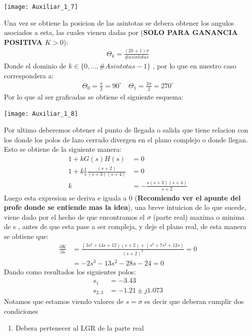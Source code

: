 \documentclass[
  11pt,
  letterpaper,
   addpoints,
   answers
  ]{exam}
\begin{document}
\begin{questions}
\begin{solution}
\begin{center}
    \texttt{[image: Auxiliar\_1\_7]}
  \end{center}
Una vez se obtiene la posicion de las asintotas se debera obtener los angulos asociados a esta, las cuales vienen dadas por (\textbf{SOLO PARA GANANCIA POSITIVA $K>0$}):
\begin{align}
    \Theta_{k} = \frac{(2k+1)\pi}{\#asintotas}
\end{align}
Donde el dominio de $k \in \{0,...,\#Asintotas -1 \}$ , por lo que en nuestro caso correspondera a:
\begin{align}
    \Theta_{0} = \frac{\pi}{2} = 90^{\circ} \quad \Theta_{1} = \frac{3\pi}{2}= 270^{\circ}
\end{align}
Por lo que al ser graficadas se obtiene el siguiente esquema:
\begin{center}
    \texttt{[image: Auxiliar\_1\_8]}
  \end{center}
Por ultimo deberemos obtener el punto de llegada o salida que tiene relacion con los donde los polos de lazo cerrado divergen en el plano complejo o donde llegan. Esto se obtiene de la siguiente manera:
\begin{align}
    1+kG(s)H(s) &= 0\\
    1+k\frac{1}{s} \frac{(s+2)}{(s+3)(s+4)} &= 0\\
    k & = -\frac{s(s+3)(s+4)}{s+2}
\end{align}
Luego esta expresion se deriva e iguala a 0 (\textbf{Recomiendo ver el apunte del profe donde se entiende mas la idea}), una breve intuicion de lo que sucede, viene dado por el hecho de que encontramos el $\sigma$ (parte real) maxima o minima de s , antes de que esta pase a ser compleja, y deje el plano real, de esta manera se obtiene que:
\begin{align}
    \frac{\partial K}{\partial s} &= \frac{(3s^{2} +14s+12)(s+2) + (s^{3} + 7s^{2} +12s)}{(s+2)^{2}} = 0\\
    &=-2s^{3}-13s^{2}-28s-24=0
\end{align}
Dando como resultados los siguientes polos:
\begin{align}
    s_{1} &= -3.43\\
    s_{2,3}&= -1.21\pm j1.073 
\end{align}
Notamos que estamos viendo valores de $s=\sigma$ es decir que deberan cumplir dos condiciones
\begin{enumerate}
    \item Debera pertenecer al LGR de la parte real

\end{enumerate}
\end{solution}
\end{questions}
\end{document}
